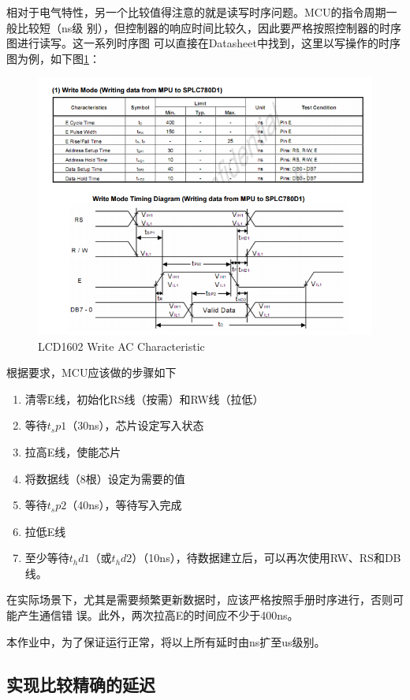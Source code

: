 \documentclass[a4paper]{ctexart}
\begin{document}
相对于电气特性，另一个比较值得注意的就是读写时序问题。MCU的指令周期一般比较短（ns级
别），但控制器的响应时间比较久，因此要严格按照控制器的时序图进行读写。这一系列时序图
可以直接在Datasheet中找到，这里以写操作的时序图为例，如下图\ref{timing1602}：
\begin{figure}[h]
  \centering\includegraphics[width=\textwidth]{./img/1602_timing.png}
  \caption{LCD1602 Write AC Characteristic}\label{timing1602}
\end{figure}

根据要求，MCU应该做的步骤如下
\begin{enumerate}
\item 清零E线，初始化RS线（按需）和RW线（拉低）
\item 等待$t_sp1$（30ns），芯片设定写入状态
\item 拉高E线，使能芯片
\item 将数据线（8根）设定为需要的值
\item 等待$t_sp2$（40ns），等待写入完成
\item 拉低E线
\item 至少等待$t_hd1$（或$t_hd2$）（10ns），待数据建立后，可以再次使用RW、RS和DB线。
\end{enumerate}
在实际场景下，尤其是需要频繁更新数据时，应该严格按照手册时序进行，否则可能产生通信错
误。此外，两次拉高E的时间应不少于400ns。

本作业中，为了保证运行正常，将以上所有延时由ns扩至us级别。

\subsection{实现比较精确的延迟}
\end{document}

